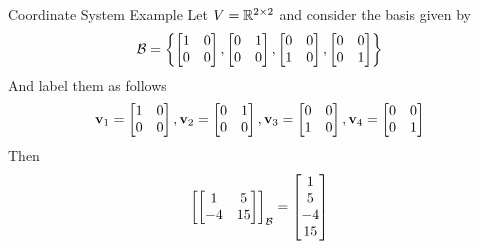 \documentclass[xcoler=dvipsnames, aspectratio=169]{beamer}
\newcommand{\B}{\mathcal{B}}
\begin{document}
    \begin{frame}{Coordinate System Example}
        Let $V=\mathbb{R}^{2\times 2}$ and consider the basis given by
        \[
            \B = \setBasic{\bMat{1 & 0\\0 & 0}, \bMat{0 & 1\\0 & 0}, \bMat{0 & 0\\1 & 0}, \bMat{0 & 0\\
            0 & 1}}
        \]
        And label them as follows
        \[
            \mathbf{v}_1 = \begin{bmatrix}1 & 0\\0 & 0\end{bmatrix},\mathbf{v}_2 = \begin{bmatrix}0 & 1\\0 & 0\end{bmatrix}, 
            \mathbf{v}_3 =\begin{bmatrix}0 & 0\\1 & 0\end{bmatrix} ,\mathbf{v}_4 = \begin{bmatrix}0 & 0\\ 0 & 1\end{bmatrix}
        \]
        Then 
        \[
            \bCoord{\bMat{1 & 5\\-4 & 15}}{\B} = \bMat{1\\5\\-4\\15}
        \]
    \end{frame}
\end{document}
